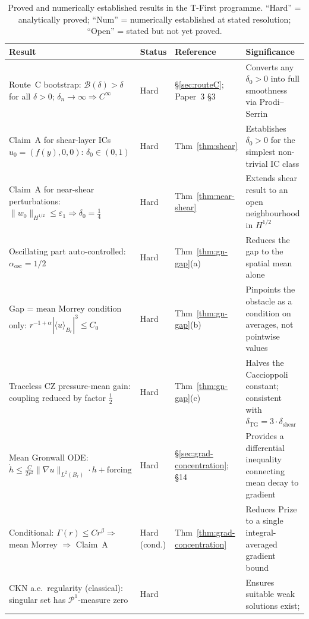 \documentclass[11pt]{article}
\theoremstyle{definition}
\theoremstyle{remark}
\newcommand{\grad}{\nabla}
\newcommand{\dlt}{\delta}
\newcommand{\eps}{\varepsilon}
\begin{document}
\begin{table}[h]
\centering
\caption{Proved and numerically established results in the T-First programme.
  ``Hard'' = analytically proved; ``Num'' = numerically established at stated
  resolution; ``Open'' = stated but not yet proved.}
\label{tab:results-summary}
\begin{tabular}{@{}p{5.2cm}lp{2.6cm}p{3.8cm}@{}}
\toprule
Result & Status & Reference & Significance \\
\midrule
Route~C bootstrap: $\mathcal{B}(\dlt)>\dlt$ for all $\dlt>0$;
  $\dlt_n\to\infty\Rightarrow C^\infty$
  & Hard & §\ref{sec:routeC}; Paper~3 §3 & Converts any $\dlt_0>0$ into
    full smoothness via Prodi--Serrin \\[4pt]
Claim~A for shear-layer ICs $u_0=(f(y),0,0)$:
  $\dlt_0\in(0,1)$
  & Hard & Thm~\ref{thm:shear} & Establishes $\dlt_0>0$ for the
    simplest non-trivial IC class \\[4pt]
Claim~A for near-shear perturbations:
  $\|w_0\|_{H^{1/2}}\leq\eps_1\Rightarrow\dlt_0=\tfrac{1}{4}$
  & Hard & Thm~\ref{thm:near-shear} & Extends shear result to an open
    neighbourhood in $H^{1/2}$ \\[4pt]
Oscillating part auto-controlled:
  $\alpha_{\mathrm{osc}}=1/2$
  & Hard & Thm~\ref{thm:gn-gap}(a) & Reduces the gap to the spatial
    mean alone \\[4pt]
Gap = mean Morrey condition only:
  $r^{-1+\alpha}|\langle u\rangle_{B_r}|^3\leq C_0$
  & Hard & Thm~\ref{thm:gn-gap}(b) & Pinpoints the obstacle as a
    condition on averages, not pointwise values \\[4pt]
Traceless CZ pressure-mean gain:
  coupling reduced by factor $\tfrac{1}{2}$
  & Hard & Thm~\ref{thm:gn-gap}(c) & Halves the Caccioppoli constant;
    consistent with $\dlt_{\mathrm{TG}}=3\cdot\dlt_{\mathrm{shear}}$ \\[4pt]
Mean Gronwall ODE: $\dot{h}\leq
  \frac{C}{2r^2}\|\grad u\|_{L^2(B_r)}\cdot h + \text{forcing}$
  & Hard & §\ref{sec:grad-concentration}; \cite{WorkingProof2026} §14 &
    Provides a differential inequality connecting mean decay to gradient \\[4pt]
Conditional: $\Gamma(r)\leq Cr^\beta\Rightarrow$
  mean Morrey $\Rightarrow$ Claim~A
  & Hard (cond.) & Thm~\ref{thm:grad-concentration} & Reduces Prize to a
    single integral-averaged gradient bound \\[4pt]
CKN a.e.\ regularity (classical): singular set has
  $\mathcal{P}^1$-measure zero
  & Hard & \cite{CKN1982} & Ensures suitable weak solutions exist;

\end{tabular}
\end{table}
\end{document}
